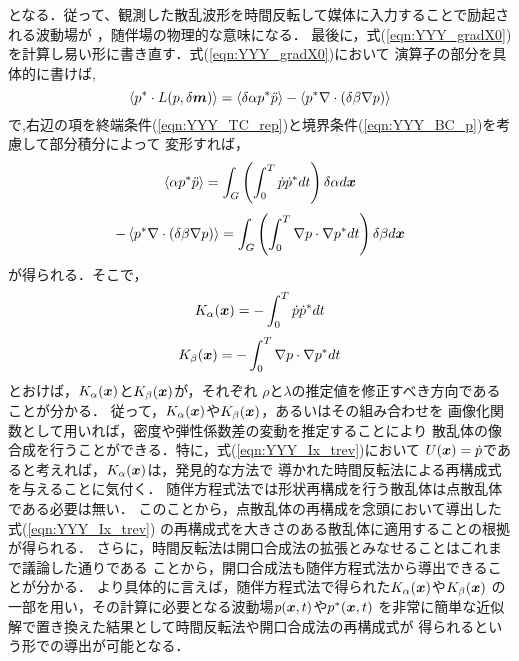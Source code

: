 となる．従って、観測した散乱波形を時間反転して媒体に入力することで励起される波動場が
，随伴場の物理的な意味になる．
最後に，式(\ref{eqn:YYY_gradX0})を計算し易い形に書き直す．式(\ref{eqn:YYY_gradX0})において
演算子の部分を具体的に書けば,
\begin{equation}
	\left< p^*  \cdot L(p,\delta \mbox{\boldmath $m$}) \right> 
	=
	\left< \delta \alpha p^*  \ddot{p} \right> 
	-
	\left< p^*  \nabla\cdot \left( \delta \beta \nabla p \right)\right> 
	\label{eqn:YYY_18}
\end{equation}
で,右辺の項を終端条件(\ref{eqn:YYY_TC_rep})と境界条件(\ref{eqn:YYY_BC_p})を考慮して部分積分によって
変形すれば，
\begin{equation}
	\left< \alpha p^*  \ddot{p} \right> 
	=\int_G \left( \int_0^T \dot{p}\dot{p}^* dt \right) \delta \alpha  d\mbox{\boldmath $x$}
	\label{eqn:YYY_19}
\end{equation}
\begin{equation}
	-\left< p^*  \nabla\cdot \left( \delta \beta \nabla p \right)\right> 
	=
	\int_G \left( \int_0^T \nabla p\cdot \nabla p^* dt \right) \delta \beta  d\mbox{\boldmath $x$}
	\label{eqn:YYY_20}
\end{equation}
が得られる．そこで，
\begin{equation}
	K_\alpha(\mbox{\boldmath $x$})=-\int_0^T \dot{p}\dot{p}^* dt 
	\label{eqn:YYY_Ka}
\end{equation}
\begin{equation}
	K_\beta(\mbox{\boldmath $x$})=-\int_0^T \nabla p\cdot \nabla p^* dt 
	\label{eqn:YYY_Kb}
\end{equation}
とおけば，$K_\alpha(\mbox{\boldmath $x$})$と$K_\beta(\mbox{\boldmath $x$})$が，それぞれ
$\rho$と$\lambda$の推定値を修正すべき方向であることが分かる．
従って，$K_\alpha(\mbox{\boldmath $x$})$や$K_\beta(\mbox{\boldmath $x$})$，あるいはその組み合わせを
画像化関数として用いれば，密度や弾性係数差の変動を推定することにより
散乱体の像合成を行うことができる．特に，式(\ref{eqn:YYY_Ix_trev})において
$U(\mbox{\boldmath $x$})=\dot{p}$であると考えれば，$K_\alpha(\mbox{\boldmath $x$})$は，発見的な方法で
導かれた時間反転法による再構成式を与えることに気付く．
随伴方程式法では形状再構成を行う散乱体は点散乱体である必要は無い．
このことから，点散乱体の再構成を念頭において導出した式(\ref{eqn:YYY_Ix_trev})
の再構成式を大きさのある散乱体に適用することの根拠が得られる．
さらに，時間反転法は開口合成法の拡張とみなせることはこれまで議論した通りである
ことから，開口合成法も随伴方程式法から導出できることが分かる．
より具体的に言えば，随伴方程式法で得られた$K_\alpha(\mbox{\boldmath $x$})$や$K_\beta(\mbox{\boldmath $x$})$
の一部を用い，その計算に必要となる波動場$ p(\mbox{\boldmath $x$},t)$や$p^*(\mbox{\boldmath $x$},t)$
を非常に簡単な近似解で置き換えた結果として時間反転法や開口合成法の再構成式が
得られるという形での導出が可能となる．

